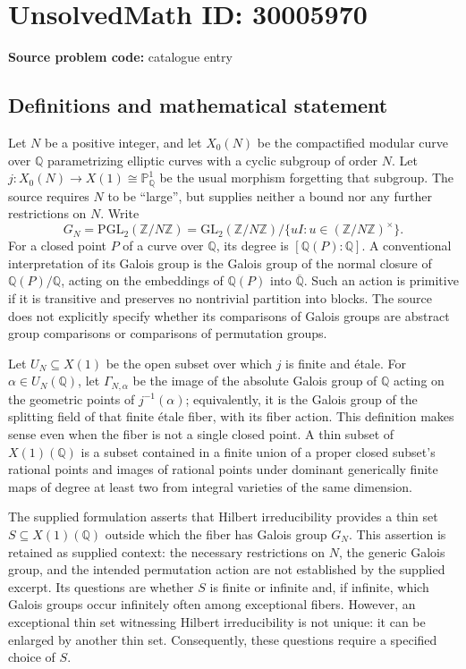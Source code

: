\documentclass[11pt]{article}
\newcommand{\Z}{\mathbb{Z}}
\newcommand{\Q}{\mathbb{Q}}
\newcommand{\PP}{\mathbb{P}}
\begin{document}
\section*{UnsolvedMath ID: 30005970}
\textbf{Source problem code:} catalogue entry
\subsection{Definitions and mathematical statement}
Let \(N\) be a positive integer, and let \(X_0(N)\) be the compactified modular curve over \(\Q\) parametrizing elliptic curves with a cyclic subgroup of order \(N\). Let \(j:X_0(N)\to X(1)\cong\PP^1_{\Q}\) be the usual morphism forgetting that subgroup. The source requires \(N\) to be ``large'', but supplies neither a bound nor any further restrictions on \(N\). Write
\[
G_N=\mathrm{PGL}_2(\Z/N\Z)
=\mathrm{GL}_2(\Z/N\Z)\big/\{uI:u\in(\Z/N\Z)^\times\}.
\]
For a closed point \(P\) of a curve over \(\Q\), its degree is \([\Q(P):\Q]\). A conventional interpretation of its Galois group is the Galois group of the normal closure of \(\Q(P)/\Q\), acting on the embeddings of \(\Q(P)\) into \(\overline{\Q}\). Such an action is primitive if it is transitive and preserves no nontrivial partition into blocks. The source does not explicitly specify whether its comparisons of Galois groups are abstract group comparisons or comparisons of permutation groups.

Let \(U_N\subseteq X(1)\) be the open subset over which \(j\) is finite and étale. For \(\alpha\in U_N(\Q)\), let \(\Gamma_{N,\alpha}\) be the image of the absolute Galois group of \(\Q\) acting on the geometric points of \(j^{-1}(\alpha)\); equivalently, it is the Galois group of the splitting field of that finite étale fiber, with its fiber action. This definition makes sense even when the fiber is not a single closed point. A thin subset of \(X(1)(\Q)\) is a subset contained in a finite union of a proper closed subset's rational points and images of rational points under dominant generically finite maps of degree at least two from integral varieties of the same dimension.

The supplied formulation asserts that Hilbert irreducibility provides a thin set \(S\subseteq X(1)(\Q)\) outside which the fiber has Galois group \(G_N\). This assertion is retained as supplied context: the necessary restrictions on \(N\), the generic Galois group, and the intended permutation action are not established by the supplied excerpt. Its questions are whether \(S\) is finite or infinite and, if infinite, which Galois groups occur infinitely often among exceptional fibers. However, an exceptional thin set witnessing Hilbert irreducibility is not unique: it can be enlarged by another thin set. Consequently, these questions require a specified choice of \(S\).
\end{document}
